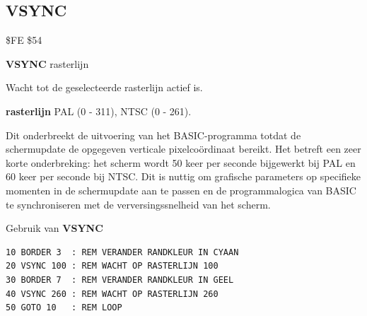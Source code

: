 \subsection{VSYNC}
\begin{description}[leftmargin=2cm,style=nextline]
\item [Token:]    \$FE \$54

\item [Formaat:]   {\bf VSYNC} rasterlijn

\item [Gebruik:]    Wacht tot de geselecteerde rasterlijn actief is.

                  {\bf rasterlijn} PAL (0 - 311), NTSC (0 - 261).

                  Dit onderbreekt de uitvoering van het BASIC-programma totdat de schermupdate de opgegeven verticale pixelcoördinaat bereikt. Het betreft een zeer korte onderbreking: het scherm wordt 50 keer per seconde bijgewerkt bij PAL en 60 keer per seconde bij NTSC. Dit is nuttig om grafische parameters op specifieke momenten in de schermupdate aan te passen en de programmalogica van BASIC te synchroniseren met de verversingssnelheid van het scherm.

\item [Voorbeeld:]  Gebruik van {\bf VSYNC}

\begin{tcolorbox}[colback=black,coltext=white]
\verbatimfont{\codefont}
\begin{verbatim}
10 BORDER 3  : REM VERANDER RANDKLEUR IN CYAAN
20 VSYNC 100 : REM WACHT OP RASTERLIJN 100
30 BORDER 7  : REM VERANDER RANDKLEUR IN GEEL
40 VSYNC 260 : REM WACHT OP RASTERLIJN 260
50 GOTO 10   : REM LOOP
\end{verbatim}
\end{tcolorbox}
\end{description}


\newpage
